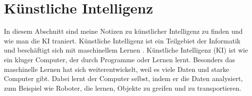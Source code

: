 \section{Künstliche Intelligenz}
\label{sec:ai}

In diesem Abschnitt sind meine Notizen zu künstlicher Intelligenz zu finden und wie man die KI traniert.
\newline
Künstliche Intelligenz ist ein Teilgebiet der Informatik und beschäftigt sich mit maschinellem Lernen \citep{ai-wikipedia}.
\newline
Künstliche Intelligenz (KI) ist wie ein kluger Computer, der durch Programme oder Lernen lernt. Besonders das maschinelle Lernen hat sich weiterentwickelt, weil es viele Daten und starke Computer gibt. Dabei lernt der Computer selbst, indem er die Daten analysiert, zum Beispiel wie Roboter, die lernen, Objekte zu greifen und zu transportieren.